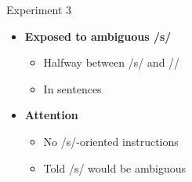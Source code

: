\documentclass{beamer}
\begin{document}
\begin{frame}{Experiment 3}

\begin{minipage}{0.45\textwidth}
\begin{itemize}
\item \textbf{Exposed to ambiguous /s/}
\begin{itemize}
\item Halfway between /s/ and /\textesh/
\item In sentences
\end{itemize}

\item \textbf{Attention}
\begin{itemize}
\item No /s/-oriented instructions
\item Told /s/ would be ambiguous
\end{itemize}


\end{itemize}
\end{minipage}
\end{frame}
\end{document}
